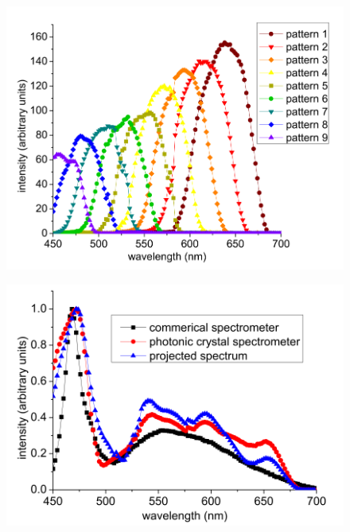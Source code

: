 \begin{frame}[c]
\begin{columns}
\begin{column}{.3\textwidth}
\begin{figure}[H]
                \includegraphics[width=1.\textwidth]{figures/Photonic crystal spectrometer_2.png} %
            \end{figure}
            \begin{figure}[H] %
                \centering %
                \includegraphics[width=1.\textwidth]{figures/Photonic crystal spectrometer_3.png} %
            \end{figure}
        \end{column}
    \end{columns}
\end{frame}

